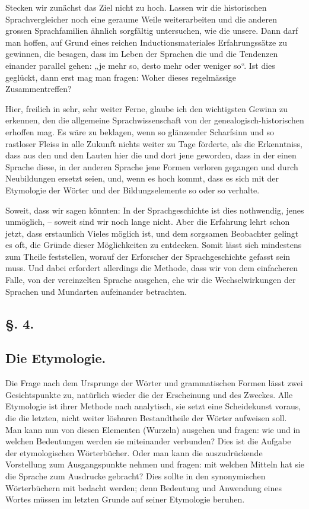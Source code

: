 {Stecken wir zunächst das Ziel nicht zu hoch. Lassen wir die historischen Sprachvergleicher noch eine geraume Weile weiterarbeiten und die anderen grossen Sprachfamilien ähnlich sorgfältig untersuchen, wie die unsere. Dann darf man hoffen, auf Grund eines reichen Inductionsmateriales Erfahrungssätze zu gewinnen, die besagen, dass im Leben der Sprachen die und die Tendenzen einander parallel gehen: „je mehr so, desto mehr oder weniger so“. Ist dies geglückt, dann erst mag man fragen: Woher dieses regelmässige Zusammentreffen?

Hier, freilich in sehr, sehr weiter Ferne, glaube ich den wichtigsten Gewinn zu erkennen, den die allgemeine Sprachwissenschaft von der genealogisch-histori\-schen erhoffen mag. Es wäre zu beklagen, wenn so glänzender Scharfsinn und so rastloser Fleiss in alle Zukunft nichts \label{fp.188} weiter zu Tage förderte, als die Erkenntniss, dass aus den und den Lauten hier die und dort jene geworden, dass in der einen Sprache diese, in der anderen Sprache jene Formen verloren gegangen und durch Neubildungen ersetzt seien, und, wenn es hoch kommt, dass es sich mit der Etymologie der Wörter und der Bildungselemente so oder so verhalte.

Soweit, dass wir sagen könnten: In der Sprachgeschichte ist dies nothwendig, jenes unmöglich, – soweit sind wir noch lange nicht. Aber die Erfahrung lehrt schon jetzt, dass erstaunlich Vieles möglich ist, und dem sorgsamen Beobachter gelingt es oft, die Gründe dieser Möglichkeiten zu entdecken. Somit \label{sp.179} lässt sich mindestens zum Theile feststellen, worauf der Erforscher der Sprachgeschichte gefasst sein muss. Und dabei erfordert allerdings die Methode, dass wir von dem einfacheren Falle, von der vereinzelten Sprache ausgehen, ehe wir die Wechselwirkungen der Sprachen und Mundarten aufeinander betrachten.

\subsection*{§. 4.}\label{III.II.4}
\subsection*{Die Etymologie.}
Die Frage nach dem Ursprunge der Wörter und grammatischen Formen lässt zwei Gesichtspunkte zu, natürlich wieder die der Erscheinung und des Zweckes. Alle Etymologie ist ihrer Methode nach analytisch, sie setzt eine Scheidekunst voraus, die die letzten, nicht weiter lösbaren Bestandtheile der Wörter aufweisen soll. Man kann nun von diesen Elementen (Wurzeln) ausgehen und fragen: wie und in welchen Bedeutungen werden sie miteinander verbunden? Dies ist die Aufgabe der etymologischen Wörterbücher. Oder man kann die auszudrückende Vorstellung zum Ausgangspunkte nehmen und fragen: mit welchen Mitteln hat sie die Sprache zum Ausdrucke gebracht? Dies sollte in den synonymischen Wörterbüchern mit bedacht werden; denn Bedeutung und Anwendung eines Wortes müssen im letzten Grunde auf seiner Etymologie beruhen.

}
